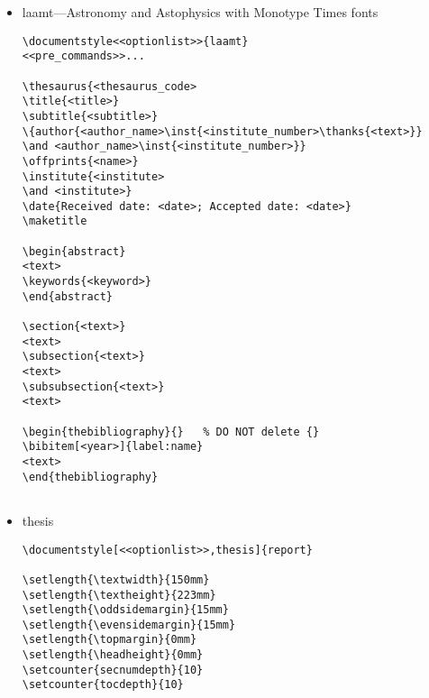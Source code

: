 \begin{itemize}
\begin{small}
\begin{verbatim}
\end{verbatim}
\end{small}

\item laamt---Astronomy and Astophysics with Monotype Times fonts 

\begin{small}
\begin{verbatim}
\documentstyle<<optionlist>>{laamt}
<<pre_commands>>...

\thesaurus{<thesaurus_code>
\title{<title>}
\subtitle{<subtitle>}
\{author{<author_name>\inst{<institute_number>\thanks{<text>}} 
\and <author_name>\inst{<institute_number>}}
\offprints{<name>}
\institute{<institute> 
\and <institute>}
\date{Received date: <date>; Accepted date: <date>}
\maketitle

\begin{abstract}
<text>
\keywords{<keyword>}
\end{abstract}

\section{<text>}
<text>
\subsection{<text>}
<text>
\subsubsection{<text>}
<text>

\begin{thebibliography}{}	% DO NOT delete {}
\bibitem[<year>]{label:name}
<text>
\end{thebibliography}


\end{verbatim}
\end{small}

\item thesis

\begin{small}
\begin{verbatim}
\documentstyle[<<optionlist>>,thesis]{report} 
  
\setlength{\textwidth}{150mm} 
\setlength{\textheight}{223mm} 
\setlength{\oddsidemargin}{15mm} 
\setlength{\evensidemargin}{15mm} 
\setlength{\topmargin}{0mm} 
\setlength{\headheight}{0mm} 
\setcounter{secnumdepth}{10} 
\setcounter{tocdepth}{10} 
 

\end{verbatim}
\end{small}
\end{itemize}
